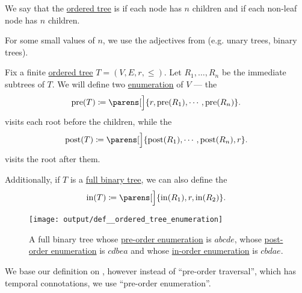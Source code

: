 \begin{definition}\label{def:n_ary_tree}
  We say that the \hyperref[def:ordered_tree]{ordered tree} is  if each node has  \( n \) children and  if each non-leaf node has  \( n \) children.

  For some small values of \( n \), we use the adjectives from  (e.g. unary trees, binary trees).
\end{definition}

\begin{definition}\label{def:ordered_tree_enumeration}
  Fix a finite \hyperref[def:ordered_tree]{ordered tree} \( T = (V, E, r, \leq) \). Let \( R_1, \ldots, R_n \) be the immediate subtrees of \( T \). We will define two \hyperref[def:enumeration]{enumeration} of \( V \) --- the 
  \begin{equation}\label{eq:def:ordered_tree_enumeration/pre}
    \op{pre}(T) \coloneqq \parens[\Big]{ r, \op{pre}(R_1), \cdots, \op{pre}(R_n) }.
  \end{equation}
  visits each root before the children, while the 
  \begin{equation}\label{eq:def:ordered_tree_enumeration/post}
    \op{post}(T) \coloneqq \parens[\Big]{ \op{post}(R_1), \cdots, \op{post}(R_n), r }.
  \end{equation}
  visits the root after them.

  Additionally, if \( T \) is a \hyperref[def:n_ary_tree]{full binary tree}, we can also define the 
  \begin{equation}\label{eq:def:ordered_tree_enumeration/in}
    \op{in}(T) \coloneqq \parens[\Big]{ \op{in}(R_1), r, \op{in}(R_2) }.
  \end{equation}

  \begin{figure}[!ht]
    \centering
    \texttt{[image: output/def\_\_ordered\_tree\_enumeration]}
    \caption{A full binary tree whose \hyperref[eq:def:ordered_tree_enumeration/pre]{pre-order enumeration} is \( abcde \), whose \hyperref[eq:def:ordered_tree_enumeration/post]{post-order enumeration} is \( cdbea \) and whose \hyperref[eq:def:ordered_tree_enumeration/in]{in-order enumeration} is \( cbdae \).}
    \label{fig:def:ordered_tree_enumeration}
  \end{figure}
\end{definition}
\begin{comments}
  \item We base our definition on \cite[228]{Erickson2019}, however instead of \enquote{pre-order traversal}, which has temporal connotations, we use \enquote{pre-order enumeration}.
\end{comments}

